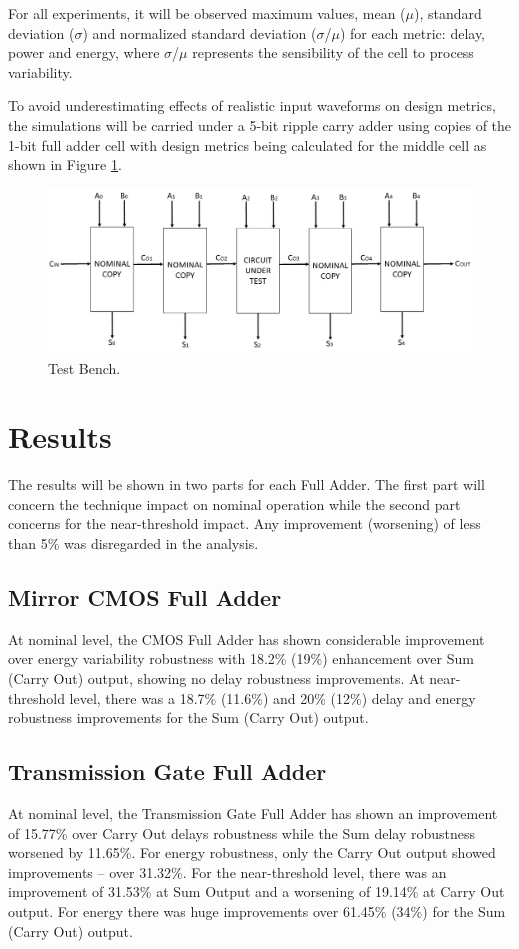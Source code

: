 \documentclass[ecp,tc, english]{iiufrgs}
\begin{document}
For all experiments, it will be observed maximum values, mean (\(\mu\)), standard deviation (\(\sigma\)) and normalized standard deviation (\(\sigma\)/\(\mu\)) for each metric: delay, power and energy, where \(\sigma\)/\(\mu\) represents the sensibility of the cell to process variability. 

To avoid underestimating effects of realistic input waveforms on design metrics, the simulations will be carried under a 5-bit ripple carry adder using copies of the 1-bit full adder cell with design metrics being calculated for the middle cell as shown in Figure \ref{fig:Fig6}. 

\begin{figure}[H]
\centering
\includegraphics[width=.8\textwidth]{testbench.jpg}
\caption{Test Bench.}
\label{fig:Fig6}
\end{figure}

\chapter{Results}

The results will be shown in two parts for each Full Adder. The first part will concern the technique impact on nominal operation while the second part concerns for the near-threshold impact. Any improvement (worsening) of less than 5\% was disregarded in the analysis. 

\section{Mirror CMOS Full Adder}
At nominal level, the CMOS Full Adder has shown considerable improvement over energy variability robustness with 18.2\% (19\%) enhancement over Sum (Carry Out) output, showing no delay robustness improvements. At near-threshold level, there was a 18.7\% (11.6\%) and 20\% (12\%) delay and energy robustness improvements for the Sum (Carry Out) output. 

\section{Transmission Gate Full Adder}
At nominal level, the Transmission Gate Full Adder has shown an improvement of 15.77\% over Carry Out delays robustness while the Sum delay robustness worsened by 11.65\%. For energy robustness, only the Carry Out output showed improvements – over 31.32\%.
For the near-threshold level, there was an improvement of 31.53\% at Sum Output and a worsening of 19.14\% at Carry Out output. For energy there was huge improvements over 61.45\% (34\%) for the Sum (Carry Out) output.
\end{document}
